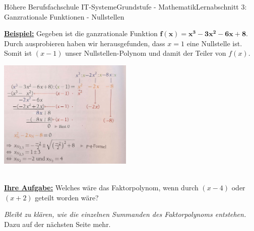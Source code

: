 \documentclass[11pt,twocolumn,oneside,openany,headings=optiontotoc,11pt,numbers=noenddot]{article}
\begin{document}
\begin{worksheet}{Höhere Berufsfachschule IT-Systeme}{Grundstufe - Mathematik}{Lernabschnitt 3: Ganzrationale Funktionen - Nullstellen}
\begin{framed}
		\end{framed}
		\noindent
		\textbf{\underline{Beispiel:}} Gegeben ist die ganzrationale Funktion \(\mathbf{f(x) = x^3 - 3x^2 - 6x +8}\). Durch ausprobieren haben wir herausgefunden, dass \(x=1\) eine Nullstelle ist. Somit ist \((x-1)\) unser \grq{}Nullstellen-Polynom\grq{} und damit der Teiler von \(f(x)\).\\
		\par\noindent
		\includegraphics[width=0.48\textwidth]{../99_Bilder/polDiv.jpg}\\
		\tiny{}\normalsize\\
		\par\noindent
		\underline{\textbf{Ihre Aufgabe:}} Welches wäre das Faktorpolynom, wenn durch \((x-4)\) oder \((x+2)\) geteilt worden wäre?\\
		\par\noindent
		\textit{Bleibt zu klären, wie die einzelnen Summanden des Faktorpolynoms entstehen.} Dazu auf der nächsten Seite mehr.
		\onecolumn

\end{worksheet}
\end{document}
